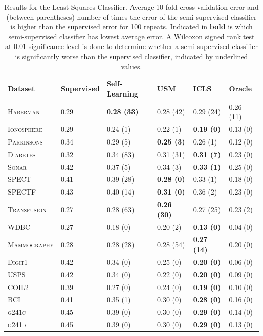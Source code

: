 \documentclass[twoside]{memoir}\usepackage[]{graphicx}\usepackage{xcolor}
\begin{document}
\begin{table}[t]
\caption{Results for the Least Squares Classifier. Average 10-fold cross-validation error and (between parentheses) number of times the error of the semi-supervised classifier is higher than the supervised error for 100 repeats. Indicated in \textbf{bold} is which semi-supervised classifier has lowest average error. A Wilcoxon signed rank test at 0.01 significance level is done to determine whether a semi-supervised classifier is significantly worse than the supervised classifier, indicated by \underline{underlined} values.} \label{table:cvresults}
\centering
\begin{tabular}{llllll}
  \toprule
Dataset & Supervised & Self-Learning & USM & ICLS & Oracle \\ 
  \midrule
\textsc{Haberman} & 0.29 & \textbf{0.28 (33)} & 0.28 (42) & 0.29 (24) & 0.26 (11) \\ 
  \textsc{Ionosphere} & 0.29 & 0.24 (1) & 0.22 (1) & \textbf{0.19 (0)} & 0.13 (0) \\ 
  \textsc{Parkinsons} & 0.34 & 0.29 (5) & \textbf{0.25 (3)} & 0.26 (1) & 0.12 (0) \\ 
  \textsc{Diabetes} & 0.32 & \underline{0.34 (83)} & 0.31 (31) & \textbf{0.31 (7)} & 0.23 (0) \\ 
  \textsc{Sonar} & 0.42 & 0.37 (5) & 0.34 (3) & \textbf{0.33 (1)} & 0.25 (0) \\ 
  \textsc{SPECT} & 0.41 & 0.39 (28) & \textbf{0.28 (0)} & 0.33 (1) & 0.18 (0) \\ 
  \textsc{SPECTF} & 0.43 & 0.40 (14) & \textbf{0.31 (0)} & 0.36 (2) & 0.23 (0) \\ 
  \textsc{Transfusion} & 0.27 & \underline{0.28 (63)} & \textbf{0.26 (30)} & 0.27 (25) & 0.23 (2) \\ 
  \textsc{WDBC} & 0.27 & 0.18 (0) & 0.20 (2) & \textbf{0.13 (0)} & 0.04 (0) \\ 
  \textsc{Mammography} & 0.28 & 0.28 (28) & 0.28 (54) & \textbf{0.27 (14)} & 0.20 (0) \\ 
  \textsc{Digit1} & 0.42 & 0.34 (0) & 0.25 (0) & \textbf{0.20 (0)} & 0.06 (0) \\ 
  \textsc{USPS} & 0.42 & 0.34 (0) & 0.22 (0) & \textbf{0.20 (0)} & 0.09 (0) \\ 
  \textsc{COIL2} & 0.39 & 0.27 (0) & 0.24 (0) & \textbf{0.19 (0)} & 0.10 (0) \\ 
  \textsc{BCI} & 0.41 & 0.35 (1) & 0.30 (0) & \textbf{0.28 (0)} & 0.16 (0) \\ 
  \textsc{g241c} & 0.45 & 0.39 (0) & 0.30 (0) & \textbf{0.29 (0)} & 0.14 (0) \\ 
  \textsc{g241d} & 0.45 & 0.39 (0) & 0.30 (0) & \textbf{0.29 (0)} & 0.13 (0) \\ 
   \bottomrule

\end{tabular}
\end{table}
\end{document}

